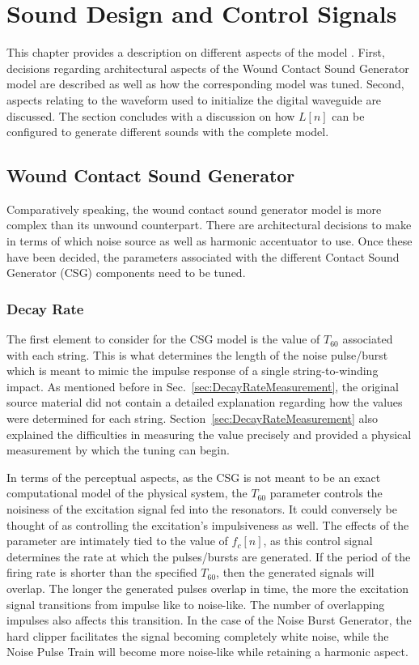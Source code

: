 \documentclass[../main.tex]{subfiles}
\begin{document}
\chapter{Sound Design and Control Signals}
This chapter provides a description on different aspects of the model . First, decisions regarding architectural aspects of the Wound Contact Sound Generator model are described as well as how the corresponding model was tuned. Second, aspects relating to the waveform used to initialize the digital waveguide are discussed. The section concludes with a discussion on how $L[n]$ can be configured to generate different sounds with the complete model.

\section{Wound Contact Sound Generator}
Comparatively speaking, the wound contact sound generator model is more complex than its unwound counterpart. There are architectural decisions to make in terms of which noise source as well as harmonic accentuator to use. Once these have been decided, the parameters associated with the different Contact Sound Generator (CSG) components need to be tuned.

\subsection{Decay Rate}
The first element to consider for the CSG model is the value of $T_{60}$ associated with each string. This is what determines the length of the noise pulse/burst which is meant to mimic the impulse response of a single string-to-winding impact. As mentioned before in Sec.~\ref{sec:DecayRateMeasurement}, the original source material did not contain a detailed explanation regarding how the values were determined for each string. Section~\ref{sec:DecayRateMeasurement} also explained the difficulties in measuring the value precisely and provided a physical measurement by which the tuning can begin.

In terms of the perceptual aspects, as the CSG is not meant to be an exact computational model of the physical system, the $T_{60}$ parameter controls the noisiness of the excitation signal fed into the resonators. It could conversely be thought of as controlling the excitation's impulsiveness as well. The effects of the parameter are intimately tied to the value of $f_c[n]$, as this control signal determines the rate at which the pulses/bursts are generated. If the period of the firing rate is shorter than the specified $T_{60}$, then the generated signals will overlap. The longer the generated pulses overlap in time, the more the excitation signal transitions from impulse like to noise-like. The number of overlapping impulses also affects this transition. In the case of the Noise Burst Generator, the hard clipper facilitates the signal becoming completely white noise, while the Noise Pulse Train will become more noise-like while retaining a harmonic aspect. 
\end{document}
